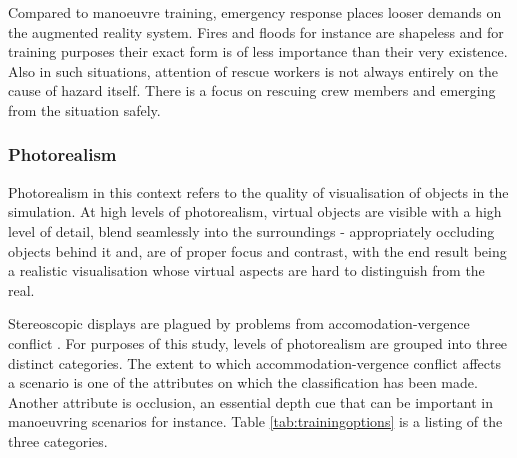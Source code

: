 Compared to manoeuvre training, emergency response places looser demands on the augmented reality system. Fires and floods for instance are shapeless and for training purposes their exact form is of less importance than their very existence. Also in such situations, attention of rescue workers is not always entirely on the cause of hazard itself. There is a focus on rescuing crew members and emerging from the situation safely. 

\subsubsection{Photorealism}
\label{sec:photorealism}

Photorealism in this context refers to the quality of visualisation of objects in the simulation. At high levels of photorealism, virtual objects are visible with a high level of detail, blend seamlessly into the surroundings - appropriately occluding objects behind it and, are of proper focus and contrast, with the end result being a realistic visualisation whose virtual aspects are hard to distinguish from the real. 

Stereoscopic displays are plagued by problems from accomodation-vergence conflict \parencite{hoffman2008vergence}. For purposes of this study, levels of photorealism are grouped into three distinct categories. The extent to which accommodation-vergence conflict affects a scenario is one of the attributes on which the classification has been made. Another attribute is occlusion, an essential depth cue that can be important in manoeuvring scenarios for instance. Table \ref{tab:trainingoptions} is a listing of the three categories.

